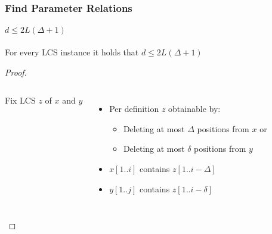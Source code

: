 \begin{frame}
	\frametitle{Find Parameter Relations}
	\framesubtitle{$d \leq 2L(\Delta + 1)$}
	
	\begin{theorem}
	For every LCS instance it holds that $d \leq 2L(\Delta + 1)$
	\end{theorem}

	\pause	
	
	\begin{proof}%
	\color{black}%
	\vspace{1ex}%
	\begin{columns}[onlytextwidth]
	Fix LCS $z$ of $x$ and $y$
	\begin{itemize}
		\color{black}
		\item<2-> Per definition $z$ obtainable by:
		\begin{itemize}
			\color{black}
			\item<2-> Deleting at most $\Delta$ positions from $x$ or
			\item<2-> Deleting at most $\delta$ positions from $y$
		\end{itemize}
		\item<3-> $x[1..i]$ contains $z[1..i-\Delta]$
		\item<3-> $y[1..j]$ contains $z[1..i-\delta]$
	\end{itemize}
	
	\vspace{2ex}
	
	
	\end{columns}
	\end{proof}
\end{frame}